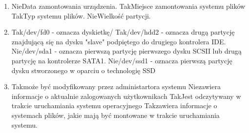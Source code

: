 \begin{enumerate}
	\newpage
	
	\item {}
	{Nie}{Data zamontowania urządzenia.}
	{Tak}{Miejsce zamontowania systemu plików}
	{Tak}{Typ systemu plików.}
	{Nie}{Wielkość partycji.}

	\item {}
	{Tak}{/dev/fd0 - oznacza dyskietkę/}
	{Tak}{/dev/hdd2 - oznacza drugą partycję znajdującą się na dysku "slave" podpiętego do drugiego kontrolera IDE.}
	{Nie}{/dev/sda1 - oznacza pierwszą partycję pierwszego dysku SCSII lub drugą partycję na kontrolerze SATA1.}
	{Nie}{/dev/ssd1 - oznacza pierwszą partycję dysku stworzonego w oparciu o technologię SSD}
	
	\item {}
	{Tak}{może być modyfikowany przez administartora systemu}
	{Nie}{zawiera informacje o aktualnie zalogowanych użytkownikach}
	{Tak}{Jest odczytywany w trakcie uruchamiania systemu operacyjnego}
	{Tak}{zawiera informacje o systemach plików, jakie mają być montowane w trakcie uruchamiania systemu.}
		
\end{enumerate}